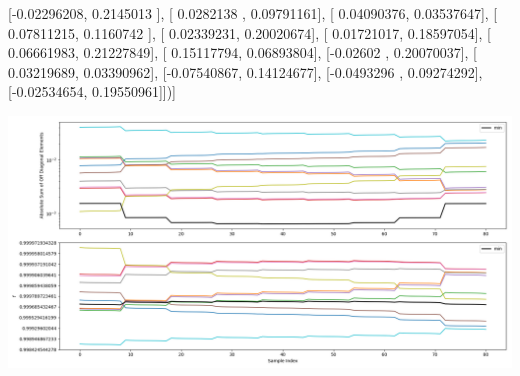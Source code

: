 \documentclass{article}
\begin{document}
       [-0.02296208,  0.2145013 ],
       [ 0.0282138 ,  0.09791161],
       [ 0.04090376,  0.03537647],
       [ 0.07811215,  0.1160742 ],
       [ 0.02339231,  0.20020674],
       [ 0.01721017,  0.18597054],
       [ 0.06661983,  0.21227849],
       [ 0.15117794,  0.06893804],
       [-0.02602   ,  0.20070037],
       [ 0.03219689,  0.03390962],
       [-0.07540867,  0.14124677],
       [-0.0493296 ,  0.09274292],
       [-0.02534654,  0.19550961]])]
\begin{center}
\includegraphics[scale=.9]{report_pickled_controls166/control_dpn_all.png}

\end{center}
\end{document}
